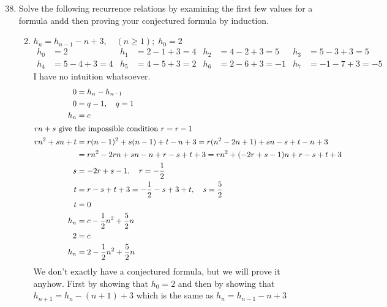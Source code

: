 \documentclass{article}
\begin{document}
\begin{enumerate}
  \setcounter{enumi}{37}
  \item
  Solve the following recurrence relations by examining the first few values for a formula andd then proving your conjectured formula by induction.
  \begin{enumerate}
    \setcounter{enumii}{1}
    \item
    $h_n=h_{n-1}-n+3,\quad(n\ge1);\;h_0=2$
    \begin{align*}
      h_0&=2&h_1&=2-1+3=4&h_2&=4-2+3=5&h_3&=5-3+3=5\\
      h_4&=5-4+3=4&h_5&=4-5+3=2&h_6&=2-6+3={-1}&h_7&=-1-7+3=-5
    \end{align*}
    I have no intuition whatsoever.
    \begin{align*}
      0&=h_n-h_{n-1}\\
      0&=q-1,\quad q=1\\
      h_n&=c\\
      \intertext{$rn+s$ give the impossible condition $r=r-1$}
      rn^2+sn+t&=r(n-1)^2+s(n-1)+t-n+3=r(n^2-2n+1)+sn-s+t-n+3\\
      &=rn^2-2rn+sn-n+r-s+t+3=rn^2+(-2r+s-1)n+r-s+t+3\\
      s&=-2r+s-1,\quad r=-\frac{1}{2}\\
      t&=r-s+t+3=-\frac{1}{2}-s+3+t,\quad s=\frac{5}{2}\\
      t&=0\\
      h_n&=c-\frac{1}{2}n^2+\frac{5}{2}n\\
      2&=c\\
      h_n&=2-\frac{1}{2}n^2+\frac{5}{2}n
    \end{align*}
    We don't exactly have a conjectured formula, but we will prove it anyhow. First by showing that $h_0=2$ and then by showing that $h_{n+1}=h_n-(n+1)+3$ which is the same as $h_n=h_{n-1}-n+3$

\end{enumerate}
\end{enumerate}
\end{document}

